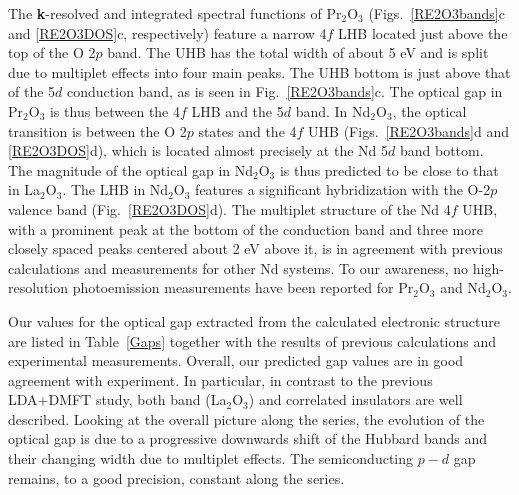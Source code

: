 \documentclass[aps,prb,twocolumn,amsmath,amssymb]{revtex4}
\def\vk{{\bf k}}
\begin{document}
The \vk-resolved and integrated spectral functions of Pr$_2$O$_3$ (Figs.~\ref{RE2O3bands}c and \ref{RE2O3DOS}c, respectively) feature a narrow 4$f$ LHB located just above the top of the O 2$p$ band. The UHB has the total width of about 5 eV and is split due to multiplet effects into four main peaks. The UHB bottom is just above that of the 5$d$ conduction band, as is seen in Fig.~\ref{RE2O3bands}c.  The optical gap in Pr$_2$O$_3$ is thus between the 4$f$ LHB and the 5$d$ band.  
In Nd$_2$O$_3$, the optical transition is between the O 2$p$ states and the 4$f$ UHB (Figs.~\ref{RE2O3bands}d and \ref{RE2O3DOS}d), which is located almost precisely at the Nd 5$d$ band bottom. The magnitude of the optical gap in Nd$_2$O$_3$  is  thus predicted to be  close to that in La$_2$O$_3$.
 The LHB in Nd$_2$O$_3$ features a significant hybridization with the O-2$p$ valence band (Fig.~\ref{RE2O3DOS}d). The multiplet structure of the Nd 4$f$ UHB, with a prominent peak at the bottom of the conduction band and three more closely spaced peaks centered about 2 eV above it, is in agreement with previous calculations \cite{Locht2016,LnSF_paper} and measurements \cite{Lang1981,pauwels_thesis} for other Nd systems. To our awareness, no high-resolution photoemission measurements have been reported for Pr$_{2}$O$_3$ and Nd$_{2}$O$_{3}$. 
 

 
 Our values for  the optical gap extracted from the calculated electronic structure  are listed in  Table~\ref{Gaps} together with the results of previous calculations and experimental measurements\cite{prokofiev1996}.
 Overall, our predicted gap values are in good agreement with experiment. In particular, in contrast to the previous LDA+DMFT study\cite{Tomczak2007}, both band (La$_2$O$_3$) and correlated insulators are well described. Looking at the overall picture along the series, the evolution of the optical gap is due to a progressive downwards shift of the Hubbard bands and their changing width due to multiplet effects. The semiconducting $p-d$ gap remains, to a good precision, constant along the series.
 
\end{document}
